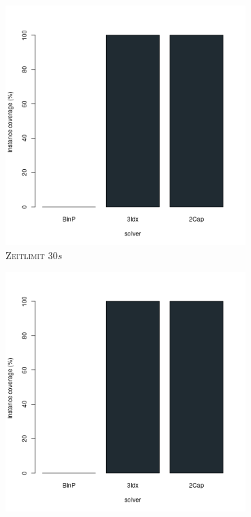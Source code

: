 \begin{figure}[H]
\centering

\begin{subfigure}[b]{0.3\textwidth}
\centering
\includegraphics[width=1.2\textwidth]{img/solver_instance_coverage_b=2_m_30s.png}
\caption{\textsc{Zeitlimit} $30s$}
\label{fig:instance_cov_b=2_m_a}
\end{subfigure}
\hfill
\begin{subfigure}[b]{0.3\textwidth}
\centering
\includegraphics[width=1.2\textwidth]{img/solver_instance_coverage_b=2_m_60s.png}

\end{subfigure}
\end{figure}
